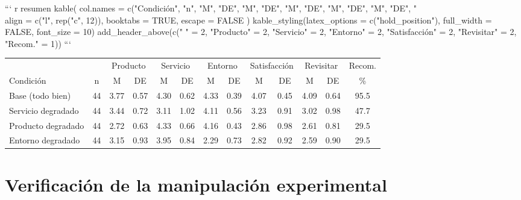 \documentclass[
  spanish,
]{article}
\begin{document}
\begin{landscape}


``` r
resumen %
  kable(
    col.names = c("Condición", "n",
                   "M", "DE", "M", "DE", "M", "DE",
                   "M", "DE", "M", "DE", "\\%
    align    = c("l", rep("c", 12)),
    booktabs = TRUE,
    escape   = FALSE
  ) %
  kable_styling(latex_options = c("hold_position"),
                full_width = FALSE,
                font_size = 10) %
  add_header_above(c(" " = 2,
                     "Producto" = 2, "Servicio" = 2, "Entorno" = 2,
                     "Satisfacción" = 2, "Revisitar" = 2,
                     "Recom." = 1))
```

\begin{table}[!h]
\centering\begingroup\fontsize{10}{12}\selectfont

\begin{tabular}{lcccccccccccc}
\toprule
\multicolumn{2}{c}{ } & \multicolumn{2}{c}{Producto} & \multicolumn{2}{c}{Servicio} & \multicolumn{2}{c}{Entorno} & \multicolumn{2}{c}{Satisfacción} & \multicolumn{2}{c}{Revisitar} & \multicolumn{1}{c}{Recom.} \\
\cmidrule(l{3pt}r{3pt}){3-4} \cmidrule(l{3pt}r{3pt}){5-6} \cmidrule(l{3pt}r{3pt}){7-8} \cmidrule(l{3pt}r{3pt}){9-10} \cmidrule(l{3pt}r{3pt}){11-12} \cmidrule(l{3pt}r{3pt}){13-13}
Condición & n & M & DE & M & DE & M & DE & M & DE & M & DE & \%\\
\midrule
Base (todo bien) & 44 & 3.77 & 0.57 & 4.30 & 0.62 & 4.33 & 0.39 & 4.07 & 0.45 & 4.09 & 0.64 & 95.5\\
Servicio degradado & 44 & 3.44 & 0.72 & 3.11 & 1.02 & 4.11 & 0.56 & 3.23 & 0.91 & 3.02 & 0.98 & 47.7\\
Producto degradado & 44 & 2.72 & 0.63 & 4.33 & 0.66 & 4.16 & 0.43 & 2.86 & 0.98 & 2.61 & 0.81 & 29.5\\
Entorno degradado & 44 & 3.15 & 0.93 & 3.95 & 0.84 & 2.29 & 0.73 & 2.82 & 0.92 & 2.59 & 0.90 & 29.5\\
\bottomrule
\end{tabular}
\endgroup{}
\end{table}

\end{landscape}

\section{Verificación de la manipulación
experimental}\label{verificaciuxf3n-de-la-manipulaciuxf3n-experimental}
\end{document}
